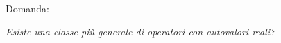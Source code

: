 \begin{frame}
    Domanda:
    \pause
    \begin{center}
        {\it Esiste una classe più generale di operatori con autovalori reali?}
    \end{center}
\end{frame}



% 
